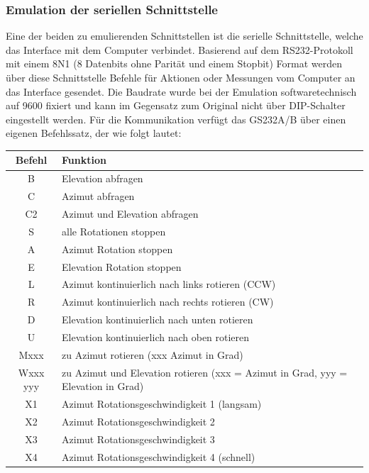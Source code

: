 \subsubsection{Emulation der seriellen Schnittstelle}
Eine der beiden zu emulierenden Schnittstellen ist die serielle Schnittstelle, welche das Interface mit dem Computer verbindet. Basierend auf dem RS232-Protokoll mit einem 8N1 (8 Datenbits ohne Parität und einem Stopbit) Format werden über diese Schnittstelle Befehle für Aktionen oder Messungen vom Computer an das Interface gesendet. Die Baudrate wurde bei der Emulation softwaretechnisch auf 9600 fixiert und kann im Gegensatz zum Original nicht über DIP-Schalter eingestellt werden. Für die Kommunikation verfügt das GS232A/B über einen eigenen Befehlssatz, der wie folgt lautet:

\begin{table}[H]
	\small
	\centering
	\begin{tabular}{| c | l |}
		\hline
		\textbf{Befehl} & \textbf{Funktion} \\
		\hline
		B & Elevation abfragen \\
		\hline
		C & Azimut abfragen \\
		\hline
		C2 & Azimut und Elevation abfragen \\
		\hline
		S & alle Rotationen stoppen \\
		\hline
		A & Azimut Rotation stoppen \\
		\hline
		E & Elevation Rotation stoppen \\
		\hline
		L & Azimut kontinuierlich nach links rotieren (CCW) \\
		\hline
		R & Azimut kontinuierlich nach rechts rotieren (CW) \\
		\hline 
		D & Elevation kontinuierlich nach unten rotieren \\
		\hline 
		U & Elevation kontinuierlich nach oben rotieren \\
		\hline
		Mxxx & zu Azimut rotieren (xxx Azimut in Grad) \\
		\hline
		Wxxx yyy & zu Azimut und Elevation rotieren (xxx = Azimut in Grad, yyy = Elevation in Grad) \\
		\hline
		X1 & Azimut Rotationsgeschwindigkeit 1 (langsam)\\
		\hline
		X2 & Azimut Rotationsgeschwindigkeit 2 \\
		\hline
		X3 & Azimut Rotationsgeschwindigkeit 3 \\
		\hline
		X4 & Azimut Rotationsgeschwindigkeit 4 (schnell)\\

\end{tabular}
\end{table}
